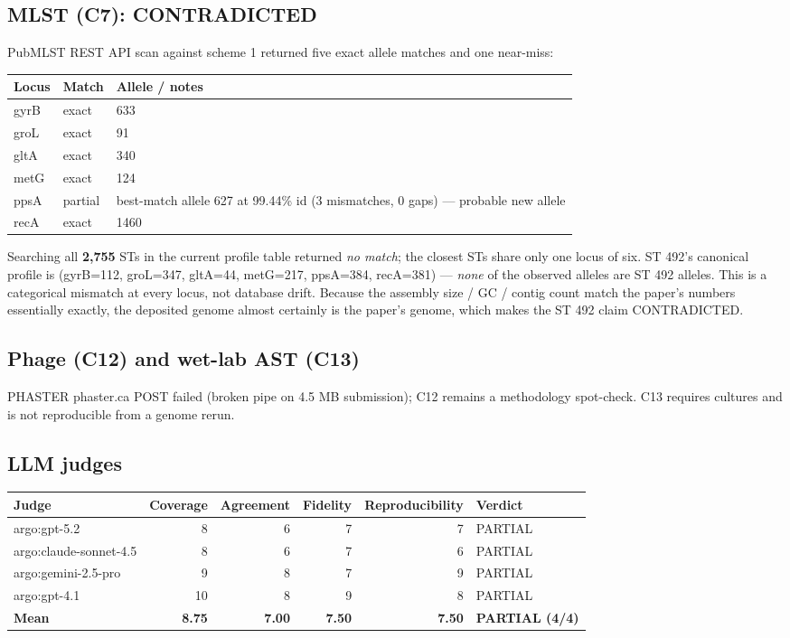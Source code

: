 \documentclass[11pt,letterpaper]{article}
\begin{document}
\subsection{MLST (C7): CONTRADICTED}
PubMLST REST API scan against scheme 1 returned five exact allele matches and one near-miss:
\begin{center}
\begin{tabular}{lll}
\toprule
Locus & Match & Allele / notes \\
\midrule
gyrB & exact & 633 \\
groL & exact & 91 \\
gltA & exact & 340 \\
metG & exact & 124 \\
ppsA & partial & best-match allele 627 at 99.44\% id (3 mismatches, 0 gaps) --- probable new allele \\
recA & exact & 1460 \\
\bottomrule
\end{tabular}
\end{center}
Searching all \textbf{2{,}755} STs in the current profile table returned \emph{no match}; the closest STs share only one locus of six. ST 492's canonical profile is (gyrB=112, groL=347, gltA=44, metG=217, ppsA=384, recA=381) --- \emph{none} of the observed alleles are ST 492 alleles. This is a categorical mismatch at every locus, not database drift. Because the assembly size / GC / contig count match the paper's numbers essentially exactly, the deposited genome almost certainly is the paper's genome, which makes the ST 492 claim CONTRADICTED.

\subsection{Phage (C12) and wet-lab AST (C13)}
PHASTER phaster.ca POST failed (broken pipe on 4.5 MB submission); C12 remains a methodology spot-check. C13 requires cultures and is not reproducible from a genome rerun.

\subsection{LLM judges}
\begin{center}
\begin{tabular}{lrrrrl}
\toprule
Judge & Coverage & Agreement & Fidelity & Reproducibility & Verdict \\
\midrule
argo:gpt-5.2            & 8 & 6 & 7 & 7 & PARTIAL \\
argo:claude-sonnet-4.5  & 8 & 6 & 7 & 6 & PARTIAL \\
argo:gemini-2.5-pro     & 9 & 8 & 7 & 9 & PARTIAL \\
argo:gpt-4.1            & 10 & 8 & 9 & 8 & PARTIAL \\
\midrule
\textbf{Mean}           & \textbf{8.75} & \textbf{7.00} & \textbf{7.50} & \textbf{7.50} & \textbf{PARTIAL (4/4)} \\
\bottomrule
\end{tabular}
\end{center}
\end{document}

